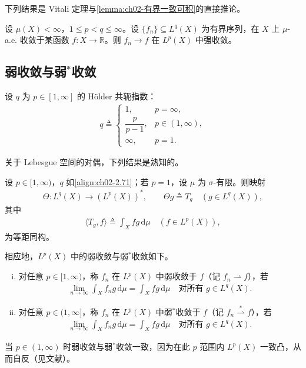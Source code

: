 \documentclass[../../main.tex]{subfiles}%
\begin{document}
下列结果是 Vitali 定理与\cref{lemma:ch02-有界一致可积}的直接推论。

\begin{proposition}\label{proposition:ch02-高Lp强收敛}
设 $\mu(X)<\infty$，$1\leqslant p<q\leqslant\infty$。设 $\{f_n\}\subseteq L^q(X)$ 为有界序列，在 $X$ 上 $\mu$-a.e. 收敛于某函数 $f:X\to\mathbb R$。则 $f_n\to f$ 在 $L^p(X)$ 中强收敛。
\end{proposition}

\subsection{弱收敛与弱$^*$收敛}\label{subsection:ch02-弱收敛}

设 $q$ 为 $p\in[1,\infty]$ 的 H\"older 共轭指数：
\begin{align}
q\triangleq 
\begin{cases}
1, & p=\infty,\\
\dfrac{p}{p-1}, & p\in(1,\infty),\\
\infty, & p=1.
\end{cases} \label{align:ch02-2.71}
\end{align}

关于 Lebesgue 空间的对偶，下列结果是熟知的。

\begin{theorem}[Riesz 表示]\label{theorem:ch02-Lp对偶}
设 $p\in[1,\infty)$，$q$ 如\eqref{align:ch02-2.71}；若 $p=1$，设 $\mu$ 为 $\sigma$-有限。则映射
\begin{align*}
\Theta:L^q(X)\to(L^p(X))^*,\qquad\Theta g\triangleq T_g\quad(g\in L^q(X)),
\end{align*}
其中
\begin{align*}
\langle T_g,f\rangle\triangleq \int_X fg\,\mathrm{d}\mu\quad(f\in L^p(X)),
\end{align*}
为等距同构。
\end{theorem}

相应地，$L^p(X)$ 中的弱收敛与弱$^*$收敛如下。

\begin{definition}\label{definition:ch02-弱弱星收敛}
\begin{enumerate}[(i)]
\item 对任意 $p\in[1,\infty)$，称 $f_n$ 在 $L^p(X)$ 中弱收敛于 $f$（记 $f_n\rightharpoonup f$），若
\begin{align*}
\lim_{n\to\infty}\int_X f_ng\,\mathrm{d}\mu=\int_X fg\,\mathrm{d}\mu\quad\text{对所有 }g\in L^q(X).
\end{align*}
\item 对任意 $p\in(1,\infty]$，称 $f_n$ 在 $L^p(X)$ 中弱$^*$收敛于 $f$（记 $f_n\stackrel{*}{\rightharpoonup}f$），若
\begin{align*}
\lim_{n\to\infty}\int_X f_ng\,\mathrm{d}\mu=\int_X fg\,\mathrm{d}\mu\quad\text{对所有 }g\in L^q(X).
\end{align*}
\end{enumerate}
\end{definition}
当 $p\in(1,\infty)$ 时弱收敛与弱$^*$收敛一致，因为在此 $p$ 范围内 $L^p(X)$ 一致凸，从而自反（见文献\cite{ref25,ref58}）。
\end{document}
